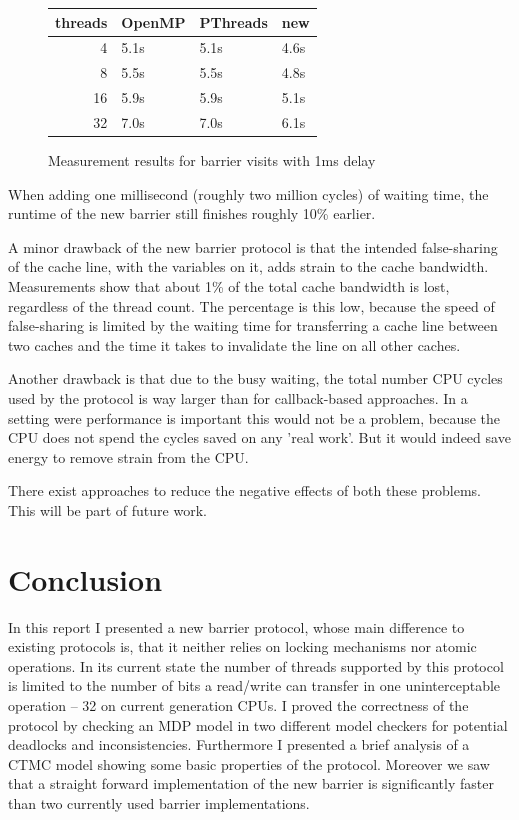 \documentclass[a4paper, 10pt]{article}
\begin{document}
\begin{figure}[htbp]
	\centering
	\begin{tabular}{r | l l l}
		threads & OpenMP & PThreads & new \\
		\hline
		 4      & 5.1s   & 5.1s     & 4.6s \\
		 8      & 5.5s   & 5.5s     & 4.8s \\
		16      & 5.9s   & 5.9s     & 5.1s \\
		32      & 7.0s   & 7.0s     & 6.1s \\
	\end{tabular}
	\caption{Measurement results for barrier visits with 1ms delay}
	\label{fig:measurement-2}
\end{figure}

When adding one millisecond (roughly two million cycles) of waiting time, the runtime of the new barrier still finishes roughly 10\% earlier.

A minor drawback of the new barrier protocol is that the intended false-sharing of the cache line, with the variables on it, adds strain to the cache bandwidth. Measurements show that about 1\% of the total cache bandwidth is lost, regardless of the thread count. The percentage is this low, because the speed of false-sharing is limited by the waiting time for transferring a cache line between two caches and the time it takes to invalidate the line on all other caches.

Another drawback is that due to the busy waiting, the total number CPU cycles used by the protocol is way larger than for callback-based approaches. In a setting were performance is important this would not be a problem, because the CPU does not spend the cycles saved on any 'real work'. But it would indeed save energy to remove strain from the CPU.

There exist approaches to reduce the negative effects of both these problems. This will be part of future work.

\section{Conclusion}
In this report I presented a new barrier protocol, whose main difference to existing protocols is, that it neither relies on locking mechanisms nor atomic operations.
In its current state the number of threads supported by this protocol is limited to the number of bits a read/write can transfer in one uninterceptable operation -- 32 on current generation CPUs.
I proved the correctness of the protocol by checking an MDP model in two different model checkers for potential deadlocks and inconsistencies.
Furthermore I presented a brief analysis of a CTMC model showing some basic properties of the protocol.
Moreover we saw that a straight forward implementation of the new barrier is significantly faster than two currently used barrier implementations.
\end{document}
